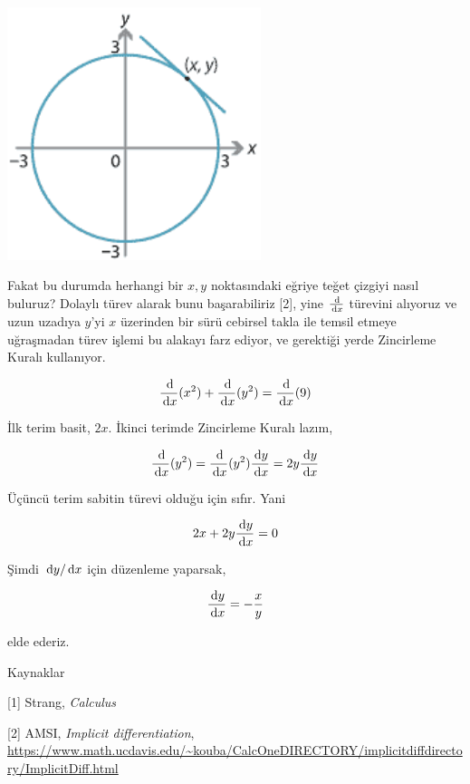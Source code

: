 \documentclass[12pt,fleqn]{article}\usepackage{../../common}
\begin{document}
\includegraphics[width=20em]{calc_multi_app_03.png}

Fakat bu durumda herhangi bir $x,y$ noktasındaki eğriye teğet çizgiyi nasıl
buluruz? Dolaylı türev alarak bunu başarabiliriz [2], yine $\frac{\,\mathrm{d}}{\,\mathrm{d} x}$
türevini alıyoruz ve uzun uzadıya $y$'yi $x$ üzerinden bir sürü cebirsel takla
ile temsil etmeye uğraşmadan türev işlemi bu alakayı farz ediyor, ve gerektiği
yerde Zincirleme Kuralı kullanıyor.

$$
\frac{\,\mathrm{d}}{\,\mathrm{d} x} (x^2)  + \frac{\,\mathrm{d}}{\,\mathrm{d} x} (y^2) = \frac{\,\mathrm{d}}{\,\mathrm{d} x} (9)
$$

İlk terim basit, $2x$. İkinci terimde Zincirleme Kuralı lazım,

$$
\frac{\,\mathrm{d}}{\,\mathrm{d} x} (y^2) = \frac{\,\mathrm{d}}{\,\mathrm{d} x} (y^2) \frac{\,\mathrm{d} y}{\,\mathrm{d} x} =
2y \frac{\,\mathrm{d} y}{\,\mathrm{d} x}
$$

Üçüncü terim sabitin türevi olduğu için sıfır. Yani

$$
2x + 2y \frac{\,\mathrm{d} y}{\,\mathrm{d} x} = 0
$$

Şimdi $\,\mathrm{d} y / \,\mathrm{d} x$ için düzenleme yaparsak,

$$
\frac{\,\mathrm{d} y}{\,\mathrm{d} x} = -\frac{x}{y}
$$

elde ederiz. 

Kaynaklar

[1] Strang, {\em Calculus}

[2] AMSI, {\em Implicit differentiation},
    \url{https://www.math.ucdavis.edu/~kouba/CalcOneDIRECTORY/implicitdiffdirectory/ImplicitDiff.html}
\end{document}
